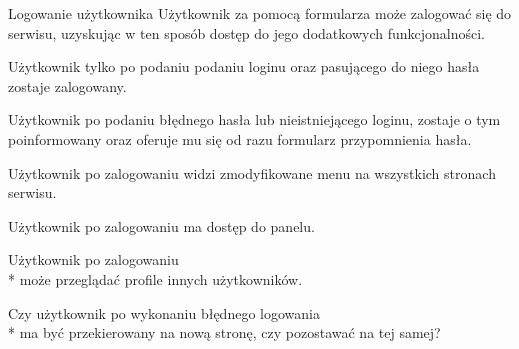\documentclass[a4paper]{article}
\begin{document}
    \begin{userstory}{Logowanie użytkownika}
        Użytkownik za pomocą formularza może zalogować się do serwisu,
        uzyskując w ten sposób dostęp do jego dodatkowych funkcjonalności.
        
        \begin{tests}
            \item{
                Użytkownik tylko po podaniu podaniu loginu oraz pasującego do niego hasła
                zostaje zalogowany.
            }
            \item{
                Użytkownik po podaniu błędnego hasła lub nieistniejącego loginu,
                zostaje o tym poinformowany oraz oferuje mu się od razu formularz przypomnienia hasła.
            }
            \item{
                Użytkownik po zalogowaniu
                widzi zmodyfikowane menu na wszystkich stronach serwisu.
            }
            \item{
                Użytkownik po zalogowaniu
                ma dostęp do panelu.
            }
            \item{
                Użytkownik po zalogowaniu\\*
                może przeglądać profile innych użytkowników.
            }
        \end{tests}
        \begin{questions}
            \item{
                Czy użytkownik po wykonaniu błędnego logowania\\*
                ma być przekierowany na nową stronę, czy pozostawać na tej samej?
            }
        \end{questions}
    \end{userstory}
\end{document}

